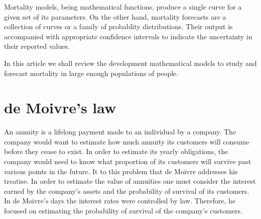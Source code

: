 \documentclass{article}
\numberwithin{equation}{section}
\begin{document}
Mortality models, being mathematical functions, produce a single curve for
a given set of its parameters. On the other hand, mortality forecasts are a
collection of curves or a family of probablity distributions. Their output
is accompanied with appropriate confidence intervals to indicate the 
uncertainty in their reported values.

In this article we shall review the development mathematical models to study
and forecast mortality in large enough populations of people.

\section{de Moivre's law}\label{s1}
An annuity is a lifelong payment made to an individual by a company. The 
company would want to estimate how much annuity its customers will consume
before they cease to exist. In order to estimate its yearly obligations, the
company would need to know what proportion of its customers will survive
past various points in the future. It to this problem that de Moivre 
\cite{de1731annuities} addresses his treatise. In order to estimate the value
of annuities one must consider the interest earned by the company's assets and
the probability of survival of its customers. In de Moivre's days the interest
rates were controlled by law. Therefore, he focused on estimating the 
probability of survival of the company's customers.
\end{document}
